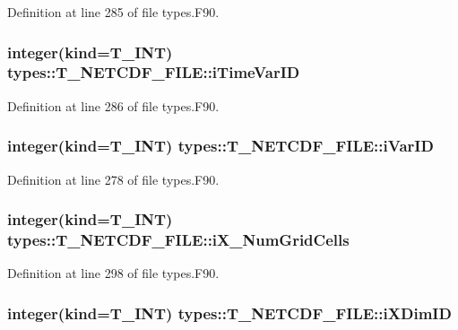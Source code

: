 Definition at line 285 of file types.F90.

\hypertarget{typetypes_1_1_t___n_e_t_c_d_f___f_i_l_e_aa1e66225dad88ba6bf41effcd02f0658}{
\subsubsection[{iTimeVarID}]{\setlength{\rightskip}{0pt plus 5cm}integer(kind={\bf T\_\-INT}) {\bf types::T\_\-NETCDF\_\-FILE::iTimeVarID}}}
\label{typetypes_1_1_t___n_e_t_c_d_f___f_i_l_e_aa1e66225dad88ba6bf41effcd02f0658}


Definition at line 286 of file types.F90.

\hypertarget{typetypes_1_1_t___n_e_t_c_d_f___f_i_l_e_ad0a6c801a98e617024ec8cc348072fbb}{
\subsubsection[{iVarID}]{\setlength{\rightskip}{0pt plus 5cm}integer(kind={\bf T\_\-INT}) {\bf types::T\_\-NETCDF\_\-FILE::iVarID}}}
\label{typetypes_1_1_t___n_e_t_c_d_f___f_i_l_e_ad0a6c801a98e617024ec8cc348072fbb}


Definition at line 278 of file types.F90.

\hypertarget{typetypes_1_1_t___n_e_t_c_d_f___f_i_l_e_a4a35d4953112a534078fc3eacb53ce69}{
\subsubsection[{iX\_\-NumGridCells}]{\setlength{\rightskip}{0pt plus 5cm}integer(kind={\bf T\_\-INT}) {\bf types::T\_\-NETCDF\_\-FILE::iX\_\-NumGridCells}}}
\label{typetypes_1_1_t___n_e_t_c_d_f___f_i_l_e_a4a35d4953112a534078fc3eacb53ce69}


Definition at line 298 of file types.F90.

\hypertarget{typetypes_1_1_t___n_e_t_c_d_f___f_i_l_e_ac8f26bc995aa5c6582fa38e3aaade9d9}{
\subsubsection[{iXDimID}]{\setlength{\rightskip}{0pt plus 5cm}integer(kind={\bf T\_\-INT}) {\bf types::T\_\-NETCDF\_\-FILE::iXDimID}}}
\label{typetypes_1_1_t___n_e_t_c_d_f___f_i_l_e_ac8f26bc995aa5c6582fa38e3aaade9d9}


